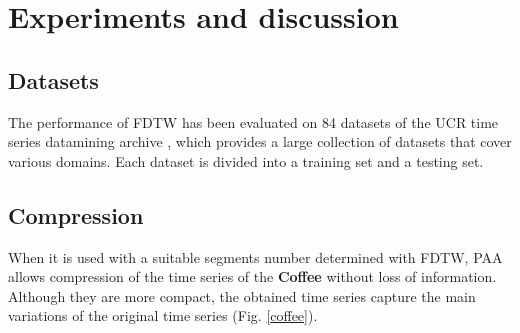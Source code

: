 \section{Experiments and discussion}
\label{sec:3}
\subsection{Datasets}
The performance of FDTW has been evaluated on  84 datasets of the UCR
time series datamining archive \cite{UCRArchive}, which provides a large collection of
datasets that cover various  domains. Each dataset is divided
into a training set and a testing set.

\subsection{Compression}
When it is used with a suitable segments number determined with FDTW, PAA allows compression of the
time series of the \textbf{Coffee}  without loss of information. Although they are more
compact, the obtained time series capture the main variations of the original time series (Fig.
\ref{coffee}).

